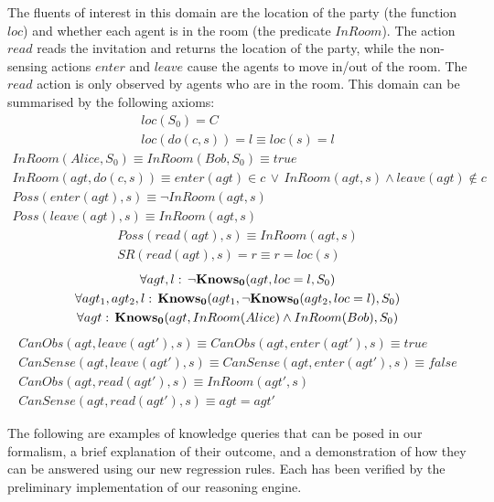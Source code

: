 The fluents of interest in this domain are the location of the party
(the function $loc$) and whether each agent is in the room (the predicate
$InRoom$). The action $read$ reads the invitation and returns the
location of the party, while the non-sensing actions $enter$ and
$leave$ cause the agents to move in/out of the room. The $read$
action is only observed by agents who are in the room. This domain
can be summarised by the following axioms:\begin{gather*}
loc(S_{0})=C\\
loc(do(c,s))=l\equiv loc(s)=l\end{gather*}
 \begin{gather*}
InRoom(Alice,S_{0})\equiv InRoom(Bob,S_{0})\equiv true\\
InRoom(agt,do(c,s))\equiv enter(agt)\in c\,\vee\, InRoom(agt,s)\wedge leave(agt)\notin c\\
Poss(enter(agt),s)\equiv\neg InRoom(agt,s)\\
Poss(leave(agt),s)\equiv InRoom(agt,s)\end{gather*}
 \begin{gather*}
Poss(read(agt),s)\equiv InRoom(agt,s)\\
SR(read(agt),s)=r\equiv r=loc(s)\end{gather*}
 \begin{gather*}
\forall agt,l:\,\neg\mathbf{Knows_{0}}(agt,loc=l,S_{0})\\
\forall agt_{1},agt_{2},l:\,\mathbf{Knows_{0}}(agt_{1},\neg\mathbf{Knows_{0}}(agt_{2},loc=l),S_{0})\\
\forall agt:\,\mathbf{Knows_{0}}(agt,InRoom(Alice)\wedge InRoom(Bob),S_{0})\end{gather*}
 \begin{gather*}
CanObs(agt,leave(agt'),s)\equiv CanObs(agt,enter(agt'),s)\equiv true\\
CanSense(agt,leave(agt'),s)\equiv CanSense(agt,enter(agt'),s)\equiv false\\
CanObs(agt,read(agt'),s)\equiv InRoom(agt',s)\\
CanSense(agt,read(agt'),s)\equiv agt=agt'\end{gather*}


\medskip{}


The following are examples of knowledge queries that can be posed
in our formalism, a brief explanation of their outcome, and a demonstration
of how they can be answered using our new regression rules. Each has
been verified by the preliminary implementation of our reasoning engine.

